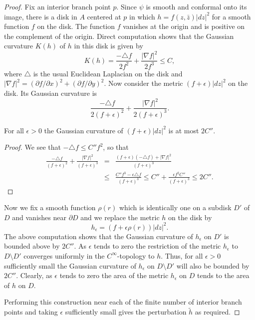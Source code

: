\begin{proof} Fix an interior branch point $p$.
 Since $\psi$  is smooth and
conformal onto its image, there is a disk in $A$ centered at $p$ in
which $h=f(z,\bar z)|dz|^2$ for a smooth function $f$ on the disk.
The function $f$ vanishes at the origin and is positive on the
complement of the origin. Direct computation shows that the Gaussian
curvature $K(h)$ of $h$ in this disk is given by
$$K(h)=\frac{-\triangle f}{2f^2}+\frac{|\nabla f|^2}{2f^3}\le C,$$
where $\triangle$ is the usual Euclidean Laplacian on the disk and $|\nabla
f|^2=(\partial f/\partial x)^2+(\partial f/\partial y)^2$.  Now consider the
metric $(f+\epsilon)|dz|^2$ on the disk. Its Gaussian curvature is
$$\frac{-\triangle f}{2(f+\epsilon)^2}+\frac{|\nabla f|^2}{2(f+\epsilon)^3}.$$
\begin{claim}
\label{claim:perturbed-metric-curvature-bound}
For all $\epsilon>0$ the Gaussian curvature of $(f+\epsilon)|dz|^2$
is at most $2C''$. \end{claim}

\begin{proof}
We see that $-\triangle f\le C''f^2$, so that
\begin{eqnarray*}\frac{-\triangle
f}{(f+\epsilon)^2}+\frac{|\nabla f|^2}{(f+\epsilon)^3} & = &
\frac{(f+\epsilon)(-\triangle
f)+|\nabla f|^2}{(f+\epsilon)^3} \\
& \le & \frac{C''f^3-\epsilon\triangle f}{(f+\epsilon)^3}\le
C''+\frac{\epsilon f^2C''}{(f+\epsilon)^3}\le 2C''.
\end{eqnarray*}
\end{proof}

Now we fix a smooth function $\rho(r)$ which is identically one on a subdisk
$D'$ of $D$ and vanishes near $\partial D$ and we replace the metric $h$ on the
disk by
$$h_\epsilon=(f+\epsilon \rho(r))|dz|^2.$$ The above computation shows that the
Gaussian curvature of $h_\epsilon$ on $D'$ is bounded above by
$2C''$. As $\epsilon$ tends to zero the restriction of the metric
$h_\epsilon$ to $D\setminus D'$ converges uniformly in the
$C^\infty$-topology to $h$. Thus, for all $\epsilon>0$ sufficiently
small the Gaussian curvature of $h_\epsilon$ on $D\setminus D'$ will
also be bounded by $2C''$. Clearly, as $\epsilon$ tends to zero the
area of the metric $h_\epsilon$ on $D$ tends to the area of $h$ on
$D$.

Performing this construction near each of the finite number of interior branch
points and taking $\epsilon$ sufficiently small gives the perturbation $\tilde
h$ as required.
\end{proof}



